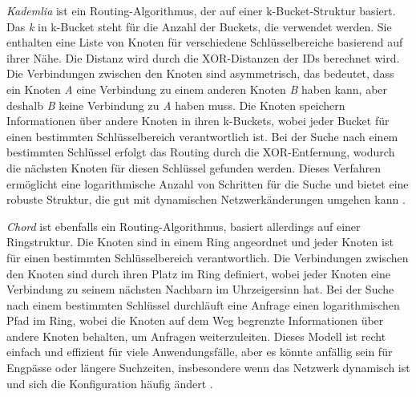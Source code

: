 \textit{Kademlia} ist ein Routing-Algorithmus, der auf einer k-Bucket-Struktur basiert. Das \textit{k} in k-Bucket steht für die Anzahl der Buckets, die verwendet werden. Sie enthalten eine Liste von Knoten für verschiedene Schlüsselbereiche basierend auf ihrer Nähe. Die Distanz wird durch die XOR-Distanzen der IDs berechnet wird. Die Verbindungen zwischen den Knoten sind asymmetrisch, das bedeutet, dass ein Knoten  \textit{A} eine Verbindung zu einem anderen Knoten \textit{B} haben kann, aber deshalb \textit{B} keine Verbindung zu \textit{A} haben muss. Die Knoten speichern Informationen über andere Knoten in ihren k-Buckets, wobei jeder Bucket für einen bestimmten Schlüsselbereich verantwortlich ist. Bei der Suche nach einem bestimmten Schlüssel erfolgt das Routing durch die XOR-Entfernung, wodurch die nächsten Knoten für diesen Schlüssel gefunden werden. Dieses Verfahren ermöglicht eine logarithmische Anzahl von Schritten für die Suche und bietet eine robuste Struktur, die gut mit dynamischen Netzwerkänderungen umgehen kann \parencite[S. 1-2]{Maymounkov_Kademlia}.

\textit{Chord} ist ebenfalls ein Routing-Algorithmus, basiert allerdings auf einer Ringstruktur. Die Knoten sind in einem Ring angeordnet und jeder Knoten ist für einen bestimmten Schlüsselbereich verantwortlich. Die Verbindungen zwischen den Knoten sind durch ihren Platz im Ring definiert, wobei jeder Knoten eine Verbindung zu seinem nächsten Nachbarn im Uhrzeigersinn hat. Bei der Suche nach einem bestimmten Schlüssel durchläuft eine Anfrage einen logarithmischen Pfad im Ring, wobei die Knoten auf dem Weg begrenzte Informationen über andere Knoten behalten, um Anfragen weiterzuleiten. Dieses Modell ist recht einfach und effizient für viele Anwendungsfälle, aber es könnte anfällig sein für Engpässe oder längere Suchzeiten, insbesondere wenn das Netzwerk dynamisch ist und sich die Konfiguration häufig ändert \parencite[S. 1-3]{Stoica_Chord}.

